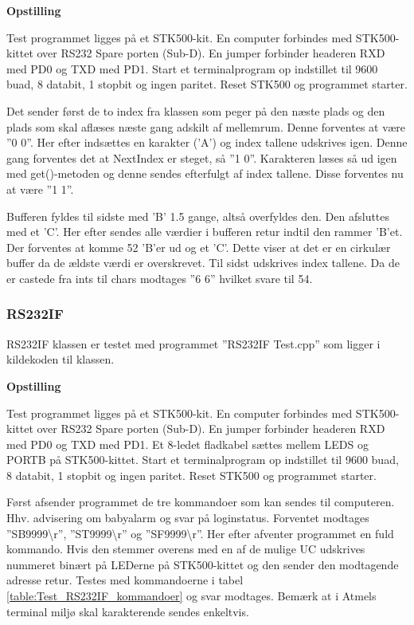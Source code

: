 \textbf{Opstilling}

Test programmet ligges på et STK500-kit.
En computer forbindes med STK500-kittet over RS232 Spare porten (Sub-D).
En jumper forbinder headeren RXD med PD0 og TXD med PD1.
Start et terminalprogram op indstillet til 9600 buad, 8 databit, 1 stopbit og ingen paritet.
Reset STK500 og programmet starter.

Det sender først de to index fra klassen som peger på den næste plads og den plads som skal aflæses næste gang adskilt af mellemrum.
Denne forventes at være ''0 0''. Her efter indsættes en karakter ('A') og index tallene udskrives igen. Denne gang forventes det at NextIndex er steget, så ''1 0''. Karakteren læses så ud igen med get()-metoden og denne sendes efterfulgt af index tallene. Disse forventes nu at være ''1 1''.

Bufferen fyldes til sidste med 'B' 1.5 gange, altså overfyldes den. Den afsluttes med et 'C'. Her efter sendes alle værdier i bufferen retur indtil den rammer 'B'et. Der forventes at komme 52 'B'er ud og et 'C'. Dette viser at det er en cirkulær buffer da de ældste værdi er overskrevet.
Til sidst udskrives index tallene. Da de er castede fra ints til chars modtages ''6 6'' hvilket svare til 54.

\subsubsection{RS232IF}
RS232IF klassen er testet med programmet ''RS232IF Test.cpp'' som ligger i kildekoden til klassen.

\textbf{Opstilling}

Test programmet ligges på et STK500-kit.
En computer forbindes med STK500-kittet over RS232 Spare porten (Sub-D).
En jumper forbinder headeren RXD med PD0 og TXD med PD1. Et 8-ledet fladkabel sættes mellem LEDS og PORTB på STK500-kittet.
Start et terminalprogram op indstillet til 9600 buad, 8 databit, 1 stopbit og ingen paritet.
Reset STK500 og programmet starter.

Først afsender programmet de tre kommandoer som kan sendes til computeren. Hhv. advisering om babyalarm og svar på loginstatus.
Forventet modtages ''SB9999\textbackslash r'', ''ST9999\textbackslash r'' og ''SF9999\textbackslash r''.
Her efter afventer programmet en fuld kommando. Hvis den stemmer overens med en af de mulige UC udskrives nummeret binært på LEDerne på STK500-kittet og den sender den modtagende adresse retur.
Testes med kommandoerne i tabel \ref{table:Test_RS232IF_kommandoer} og svar modtages. Bemærk at i Atmels terminal miljø skal karakterende sendes enkeltvis.

